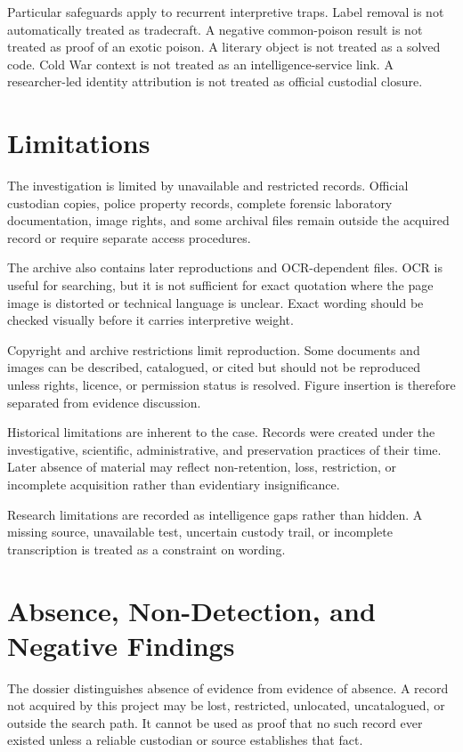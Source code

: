 Particular safeguards apply to recurrent interpretive traps. Label removal is not automatically treated as tradecraft. A negative common-poison result is not treated as proof of an exotic poison. A literary object is not treated as a solved code. Cold War context is not treated as an intelligence-service link. A researcher-led identity attribution is not treated as official custodial closure.

\section{Limitations}

The investigation is limited by unavailable and restricted records. Official custodian copies, police property records, complete forensic laboratory documentation, image rights, and some archival files remain outside the acquired record or require separate access procedures.

The archive also contains later reproductions and OCR-dependent files. OCR is useful for searching, but it is not sufficient for exact quotation where the page image is distorted or technical language is unclear. Exact wording should be checked visually before it carries interpretive weight.

Copyright and archive restrictions limit reproduction. Some documents and images can be described, catalogued, or cited but should not be reproduced unless rights, licence, or permission status is resolved. Figure insertion is therefore separated from evidence discussion.

Historical limitations are inherent to the case. Records were created under the investigative, scientific, administrative, and preservation practices of their time. Later absence of material may reflect non-retention, loss, restriction, or incomplete acquisition rather than evidentiary insignificance.

Research limitations are recorded as intelligence gaps rather than hidden. A missing source, unavailable test, uncertain custody trail, or incomplete transcription is treated as a constraint on wording.

\section{Absence, Non-Detection, and Negative Findings}

The dossier distinguishes absence of evidence from evidence of absence. A record not acquired by this project may be lost, restricted, unlocated, uncatalogued, or outside the search path. It cannot be used as proof that no such record ever existed unless a reliable custodian or source establishes that fact.

